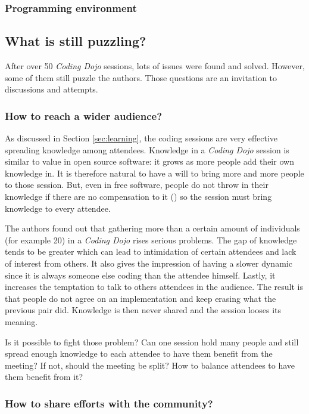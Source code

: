 \subsubsection{Programming environment}

\subsection{What is still puzzling?}\label{ssub:puzzles}

After over 50 \textit{Coding Dojo} sessions, lots of issues were found
and solved. However, some of them still puzzle the authors. Those
questions are an invitation to discussions and attempts.

\subsubsection{How to reach a wider audience?}

As discussed in Section \ref{sec:learning}, the coding sessions
are very effective spreading knowledge among attendees. Knowledge in a
\textit{Coding Dojo} session is similar to value in open source
software: it grows as more people add their own knowledge in. It is
therefore natural to have a will to bring more and more people to
those session. But, even in free software, people do not throw in
their knowledge if there are no compensation to it
(\cite{RishabGhosh}) so the session must bring knowledge to every
attendee.

The authors found out that gathering more than a certain amount of
individuals (for example 20) in a \textit{Coding Dojo} rises serious
problems. The gap of knowledge tends to be greater which can lead to
intimidation of certain attendees and lack of interest from others. It
also gives the impression of having a slower dynamic since it is
always someone else coding than the attendee himself. Lastly, it
increases the temptation to talk to others attendees in the
audience. The result is that people do not agree on an implementation
and keep erasing what the previous pair did. Knowledge is then never
shared and the session looses its meaning.

Is it possible to fight those problem? Can one session hold many
people and still spread enough knowledge to each attendee to have them
benefit from the meeting? If not, should the meeting be split? How
to balance attendees to have them benefit from it?

\subsubsection{How to share efforts with the community?}


